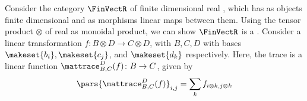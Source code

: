 Consider the category $\FinVectR$ of finite dimensional real , which has as objects finite dimensional  and as morphisms linear maps between them.
Using the tensor product $\otimes$ of real  as monoidal product, we can show $\FinVectR$ is a .
Consider a linear transformation $f\colon B\otimes D\to C\otimes D$, with $B,C,D$  with bases $\makeset{b_i},\makeset{c_j}$, and $\makeset{d_k}$ respectively.
Here, the trace is a linear function $\mattrace_{B,C}
    ^D(f)\colon B\to C$, given by
\begin{equation}
    \pars{\mattrace_{B,C}
        ^D(f) }_{i,j}=\sum_{k}f_{i\otimes k,j\otimes k}
\end{equation}





